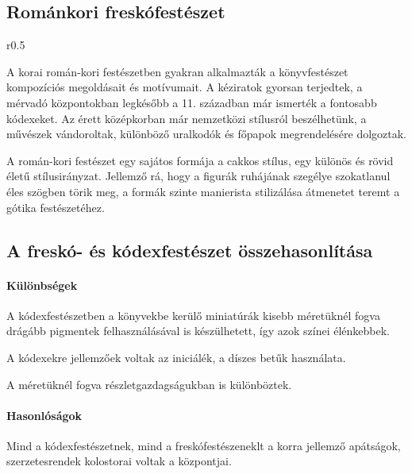 \subsection*{Románkori freskófestészet}

	\begin{wrapfigure}{r}{0.5\textwidth}
\end{wrapfigure}

A korai román-kori festészetben gyakran alkalmazták a könyvfestészet kompozíciós megoldásait és motívumait. A kéziratok gyorsan terjedtek, a mérvadó központokban legkésőbb a 11. században már ismerték a fontosabb kódexeket. Az érett középkorban már nemzetközi stílusról beszélhetünk, a művészek vándoroltak, különböző uralkodók és főpapok megrendelésére dolgoztak.

A román-kori festészet egy sajátos formája a cakkos stílus, egy különös és rövid életű stílusirányzat. Jellemző rá, hogy a figurák ruhájának szegélye szokatlanul éles szögben törik meg, a formák szinte manierista stilizálása átmenetet teremt a gótika festészetéhez.

\subsection*{A freskó- és kódexfestészet összehasonlítása}

\paragraph{Különbségek}
A kódexfestészetben a könyvekbe kerülő miniatúrák kisebb méretüknél fogva drágább pigmentek felhasználásával is készülhetett, így azok színei élénkebbek.

A kódexekre jellemzőek voltak az iniciálék, a díszes betűk használata.

A méretüknél fogva részletgazdagságukban is különböztek.

\paragraph{Hasonlóságok}

Mind a kódexfestészetnek, mind a freskófestészeneklt a korra jellemző apátságok, szerzetesrendek kolostorai voltak a központjai.

